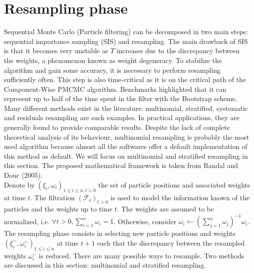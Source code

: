 \documentclass[11pt,a4,twosided,singlespacing,titlepagenumber=on]{scrreprt}
\numberwithin{equation}{chapter} %
\theoremstyle{remark}
\begin{document}
\section{Resampling phase}
Sequential Monte Carlo (Particle filtering) can be decomposed in two main steps: sequential importance sampling (SIS) and resampling. The main drawback of SIS is that it becomes very unstable as $T$ increases due to the discrepancy between the weights, a phenomenon known as weight degeneracy. To stabilize the algorithm and gain some accuracy, it is necessary to perform resampling sufficiently often. This step is also time-critical as it is on the critical path of the Component-Wise PMCMC algorithm. Benchmarks highlighted that it can represent up to half of the time spent in the filter with the Bootstrap scheme. Many different methods exist in the literature: multinomial, stratified, systematic and residuals resampling are such examples. In practical applications, they are generally found to provide comparable results. Despite the lack of complete theoretical analysis of its behaviour, multinomial resampling is probably the most used algorithm because almost all the softwares offer a default implementation of this method as default. We will focus on multinomial and stratified resampling in this section. The proposed mathematical framework is taken from Randal and Douc (2005). \\

\noindent
Denote by $\left( \xi_i, \omega_i \right)_{1 \leq i \leq n, t > 0}$ the set of particle positions and associated weights at time $t$. The filtration $(\mathcal{F}_t)_{t > 0}$ is used to model the information known of the particles and the weights up to time $t$. The weights are assumed to be normalized, i.e. $\forall t > 0, \sum_{i=1}^n \omega_i = 1$. Otherwise, consider $\omega_i \leftarrow \left( \sum_{j=1}^n \omega_j\right)^{-1} \omega_i$. The resampling phase consists in selecting new particle positions and weights $\left( \xi_i^\sim, \omega_i^\sim \right)_{1 \leq i \leq n}$ at time $t+1$ such that the discrepancy between the resampled weights $\omega_i^\sim$ is reduced. There are many possible ways to resample. Two methods are discussed in this section: multinomial and stratified resampling. \\
\end{document}
